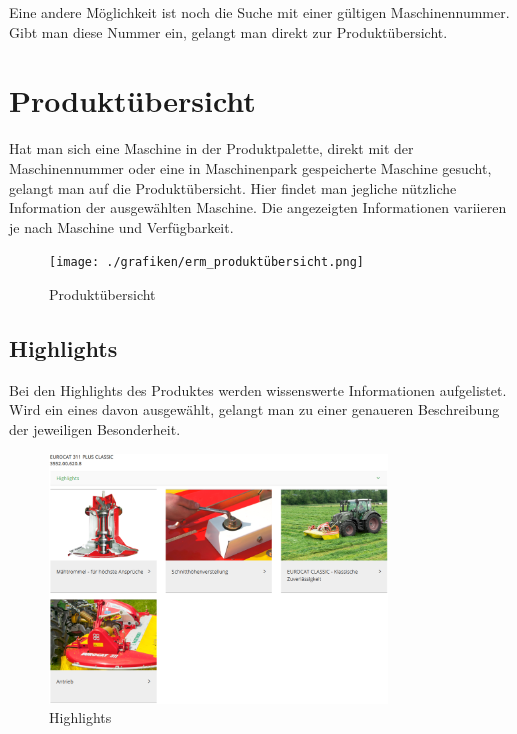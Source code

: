 Eine andere Möglichkeit ist noch die Suche mit einer gültigen Maschinennummer. Gibt man diese Nummer ein, gelangt man direkt zur Produktübersicht.

\section{Produktübersicht}

Hat man sich eine Maschine in der Produktpalette, direkt mit der Maschinennummer oder eine in Maschinenpark gespeicherte Maschine gesucht, gelangt man auf die Produktübersicht. Hier findet man jegliche nützliche Information der ausgewählten Maschine. Die angezeigten Informationen variieren je nach Maschine und Verfügbarkeit.

\begin{figure}[H]
	\centerline{
		\texttt{[image: ./grafiken/erm\_produktübersicht.png]}
	}
	\vskip0pt
	\caption{Produktübersicht} \label{fig:produktübersicht}
\end{figure}

\subsection{Highlights}

Bei den Highlights des Produktes werden wissenswerte Informationen aufgelistet. Wird ein eines davon ausgewählt, gelangt man zu einer genaueren Beschreibung der jeweiligen Besonderheit.

\begin{figure}[H]
	\centerline{
		\includegraphics[width=0.8\textwidth]{./grafiken/erm_detailansicht_highlights.PNG}
	}
	\vskip0pt
	\caption{Highlights} \label{fig:highlight}
\end{figure}

